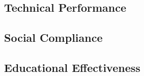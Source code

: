
\subsection{Technical Performance}


\subsection{Social Compliance}


\subsection{Educational Effectiveness}

